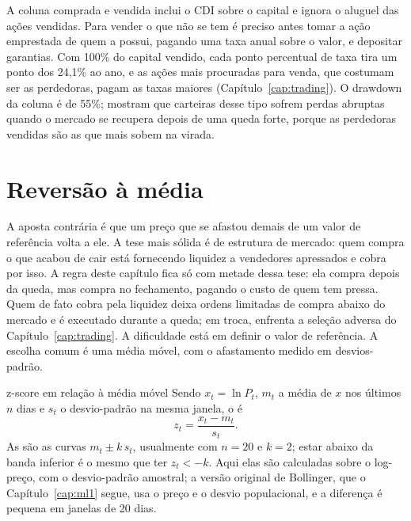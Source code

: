 A coluna comprada e vendida inclui o CDI sobre o capital e ignora o aluguel das ações vendidas. Para vender o que não se tem é preciso antes tomar a ação emprestada de quem a possui, pagando uma taxa anual sobre o valor, e depositar garantias. Com 100\% do capital vendido, cada ponto percentual de taxa tira um ponto dos 24,1\% ao ano, e as ações mais procuradas para venda, que costumam ser as perdedoras, pagam as taxas maiores (Capítulo~\ref{cap:trading}). O drawdown da coluna é de 55\%; \citet{daniel2016} mostram que carteiras desse tipo sofrem perdas abruptas quando o mercado se recupera depois de uma queda forte, porque as perdedoras vendidas são as que mais sobem na virada.

\section{Reversão à média}
\label{sec:c11-reversao}

A aposta contrária é que um preço que se afastou demais de um valor de referência volta a ele. A tese mais sólida é de estrutura de mercado: quem compra o que acabou de cair está fornecendo liquidez a vendedores apressados e cobra por isso. A regra deste capítulo fica só com metade dessa tese: ela compra depois da queda, mas compra no fechamento, pagando o custo de quem tem pressa. Quem de fato cobra pela liquidez deixa ordens limitadas de compra abaixo do mercado e é executado durante a queda; em troca, enfrenta a seleção adversa do Capítulo~\ref{cap:trading}. A dificuldade está em definir o valor de referência. A escolha comum é uma média móvel, com o afastamento medido em desvios-padrão.

\begin{definicao}{z-score em relação à média móvel}
Sendo $x_t = \ln P_t$, $m_t$ a média de $x$ nos últimos $n$ dias e $s_t$ o desvio-padrão na mesma janela, o  é
\begin{equation}
  z_t = \frac{x_t - m_t}{s_t} .
  \label{eq:c11-z}
\end{equation}
As  são as curvas $m_t \pm k\,s_t$, usualmente com $n = 20$ e $k = 2$; estar abaixo da banda inferior é o mesmo que ter $z_t < -k$. Aqui elas são calculadas sobre o log-preço, com o desvio-padrão amostral; a versão original de Bollinger, que o Capítulo~\ref{cap:ml1} segue, usa o preço e o desvio populacional, e a diferença é pequena em janelas de 20 dias.
\end{definicao}

